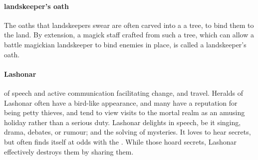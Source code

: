 \paragraph{landskeeper's oath} The oaths that landskeepers swear are often carved into a a tree, to bind them to the land. By extension, a magick staff crafted from such a tree, which can allow a battle magickian landskeeper to bind enemies in place, is called a landskeeper's oath. 
\paragraph{Lashonar}   of speech and active communication facilitating change, and travel. Heralds of Lashonar often have a bird-like appearance, and many have a reputation for being petty thieves, and tend to view visits to the mortal realm as an amusing holiday rather than a serious duty. Lashonar delights in speech, be it singing, drama, debates, or rumour; and the solving of mysteries. It loves to hear secrets, but often finds itself at odds with the . While those hoard secrets, Lashonar effectively destroys them by sharing them. 
